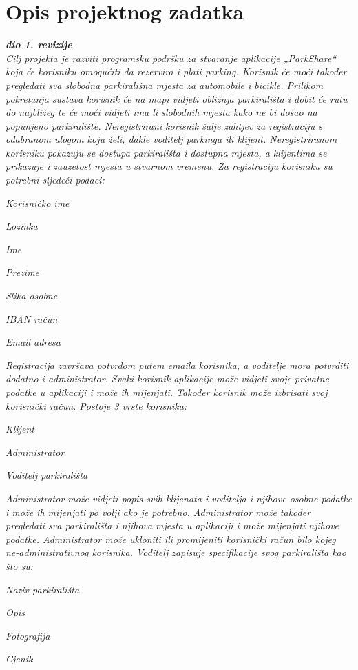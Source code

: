 \chapter{Opis projektnog zadatka}
		
		\textbf{\textit{dio 1. revizije}}\\
		
		\textit{Cilj projekta je razviti programsku podršku za stvaranje aplikacije „ParkShare“ koja će korisniku omogućiti da rezervira i plati parking. Korisnik će moći također pregledati sva slobodna parkirališna mjesta za automobile i bicikle. Prilikom pokretanja sustava korisnik će na mapi vidjeti obližnja parkirališta i dobit će rutu do najbližeg te će moći vidjeti ima li slobodnih mjesta kako ne bi došao na popunjeno parkiralište.
Neregistrirani korisnik šalje zahtjev za registraciju s odabranom ulogom koju želi, dakle voditelj parkinga ili klijent. Neregistriranom korisniku pokazuju se dostupa parkirališta i dostupna mjesta, a klijentima se prikazuje i zauzetost mjesta u stvarnom vremenu. Za registraciju korisniku su potrebni sljedeći podaci:
}
		\begin{packed_item}
			\item \textit{Korisničko ime }
			\item \textit{Lozinka }
			\item \textit{Ime }
			\item \textit{Prezime}
			\item \textit{Slika osobne }
			\item \textit{IBAN račun }
			\item \textit{Email adresa }
		\end{packed_item}
		
		\textit{Registracija završava potvrdom putem emaila korisnika, a voditelje mora potvrditi dodatno i administrator. Svaki korisnik aplikacije može vidjeti svoje privatne podatke u aplikaciji i može ih mijenjati. Također korisnik može izbrisati svoj korisnički račun. 
Postoje 3 vrste korisnika:
}
                \begin{packed_item}
			\item \textit{Klijent }
			\item \textit{Administrator }
			\item \textit{Voditelj parkirališta}
		\end{packed_item}

\textit{Administrator može vidjeti popis svih klijenata i voditelja i njihove osobne podatke i može ih mijenjati po volji ako je potrebno. Administrator može također pregledati sva parkirališta i njihova mjesta u aplikaciji i može mijenjati njihove podatke. Administrator može ukloniti ili promijeniti korisnički račun bilo kojeg ne-administrativnog korisnika. 
Voditelj zapisuje specifikacije svog parkirališta kao što su:
}
                \begin{packed_item}
			\item \textit{Naziv parkirališta }
			\item \textit{Opis }
			\item \textit{Fotografija}
                        \item \textit{Cjenik}
		\end{packed_item}

